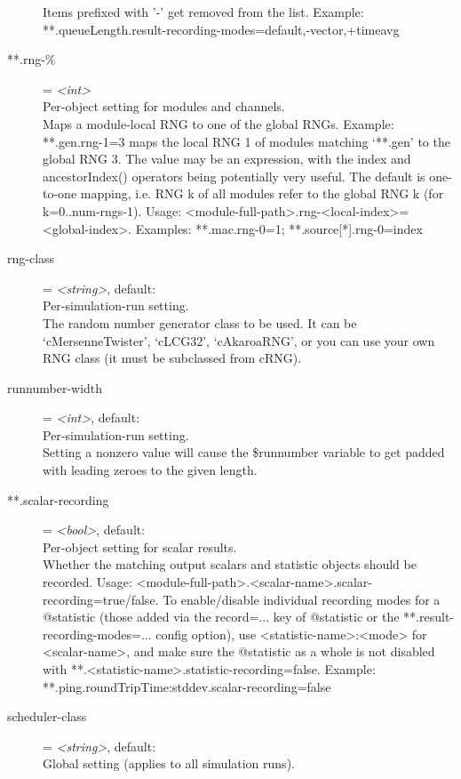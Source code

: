 \begin{description}
    Items prefixed with '-' get removed from the list. Example:
    **.queueLength.result-recording-modes=default,-vector,+timeavg
\item[**.rng-\%] = \textit{<int>}\\
    Per-object setting for modules and channels.\\
    Maps a module-local RNG to one of the global RNGs. Example: **.gen.rng-1=3
    maps the local RNG 1 of modules matching `**.gen' to the global RNG 3. The
    value may be an expression, with the index and ancestorIndex() operators
    being potentially very useful. The default is one-to-one mapping, i.e. RNG
    k of all modules refer to the global RNG k (for k=0..num-rngs-1). Usage:
    <module-full-path>.rng-<local-index>=<global-index>. Examples:
    **.mac.rng-0=1; **.source[*].rng-0=index
\item[rng-class] = \textit{<string>}, default: \\
    Per-simulation-run setting.\\
    The random number generator class to be used. It can be `cMersenneTwister',
    `cLCG32', `cAkaroaRNG', or you can use your own RNG class (it must be
    subclassed from cRNG).
\item[runnumber-width] = \textit{<int>}, default: \\
    Per-simulation-run setting.\\
    Setting a nonzero value will cause the \$runnumber variable to get padded
    with leading zeroes to the given length.
\item[**.scalar-recording] = \textit{<bool>}, default: \\
    Per-object setting for scalar results.\\
    Whether the matching output scalars and statistic objects should be
    recorded. Usage:
    <module-full-path>.<scalar-name>.scalar-recording=true/false. To
    enable/disable individual recording modes for a @statistic (those added via
    the record=... key of @statistic or the **.result-recording-modes=...
    config option), use <statistic-name>:<mode> for <scalar-name>, and make
    sure the @statistic as a whole is not disabled with
    **.<statistic-name>.statistic-recording=false. Example:
    **.ping.roundTripTime:stddev.scalar-recording=false
\item[scheduler-class] = \textit{<string>}, default: \\
    Global setting (applies to all simulation runs).\\

\end{description}
